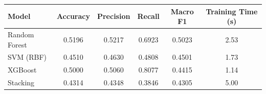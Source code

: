 \begin{tabular}{lccccc}
\hline
Model & Accuracy & Precision & Recall & Macro F1 & Training Time (s)\\
\hline
Random Forest & 0.5196 & 0.5217 & 0.6923 & 0.5023 & 2.53\\
SVM (RBF) & 0.4510 & 0.4630 & 0.4808 & 0.4501 & 1.73\\
XGBoost & 0.5000 & 0.5060 & 0.8077 & 0.4415 & 1.14\\
Stacking & 0.4314 & 0.4348 & 0.3846 & 0.4305 & 5.00\\
\hline
\end{tabular}
